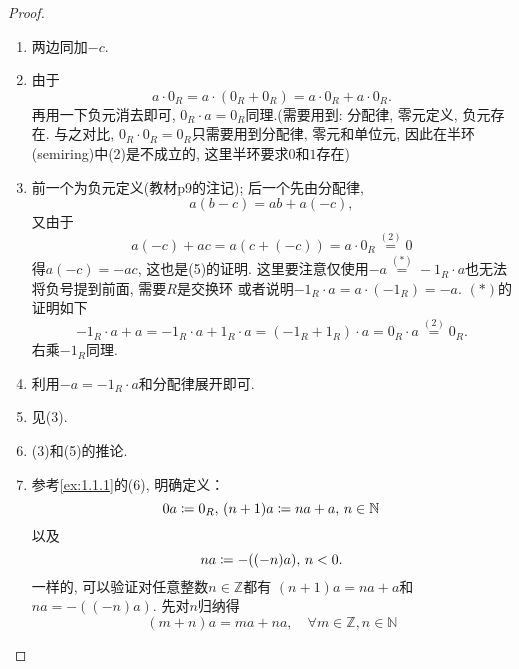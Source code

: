 \begin{proof}
    \begin{enumerate}[(1)]
        \item 两边同加$-c$.
        \item 由于
        \[
            a \cdot 0_R = a \cdot (0_R + 0_R) = a \cdot 0_R + a \cdot 0_R.
        \]
        再用一下负元消去即可, $0_R \cdot a = 0_R$同理.(需要用到: 分配律, 零元定义, 
    负元存在. 与之对比, $0_R \cdot 0_R = 0_R$只需要用到分配律, 零元和单位元, 
    因此在半环(semiring)中(2)是不成立的, 这里半环要求$0$和$1$存在)
        \item 前一个为负元定义(教材p9的注记); 后一个先由分配律, 
    \[
        a(b - c) = ab + a(-c),
    \]
    又由于
    \[
        a(-c) + ac = a(c + (-c)) = a \cdot 0_R \overset{(2)}= 0
    \]
    得$a(-c) = -ac$, 这也是(5)的证明.
    这里要注意仅使用$-a \overset{(*)}= -1_R \cdot a$也无法将负号提到前面, 需要$R$是交换环
    或者说明$-1_R \cdot a = a \cdot (-1_R) = -a$.
    $(*)$的证明如下
    \[
        -1_R \cdot a + a = -1_R \cdot a + 1_R \cdot a = (-1_R + 1_R) \cdot a = 0_R \cdot a \overset{(2)}= 0_R.
    \]
    右乘$-1_R$同理.
        \item 利用$-a = -1_R \cdot a$和分配律展开即可.
        \item 见(3).
        \item (3)和(5)的推论.
        \item 参考\ref{ex:1.1.1}的(6), 明确定义：
        \[
            0a \mathrel{\coloneqq} 0_R,\, (n + 1)a \mathrel{\coloneqq} na + a,\, n \in \mathbb{N}
        \]
        以及
        \[
            na \mathrel{\coloneqq} -((-n)a),\, n < 0.
        \]
        一样的, 可以验证对任意整数$n \in \mathbb{Z}$都有
        $(n + 1)a = na + a$和$na = -((-n)a)$.
        先对$n$归纳得
    \begin{equation}
        (m + n)a = ma + na, \quad \forall m \in \mathbb{Z}, n \in \mathbb{N}
        \tag{i}
        \label{eq:1.2.1.7}
    \end{equation}
        

\end{enumerate}
\end{proof}
